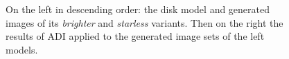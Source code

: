 \begin{figure}[h!]
  \caption{On the left in descending order: the disk model and generated images of its \textit{brighter} and \textit{starless} variants. Then on the right the results of \ac{ADI} applied to the generated image sets of the left models.}
  \label{fig:A}
\end{figure}
